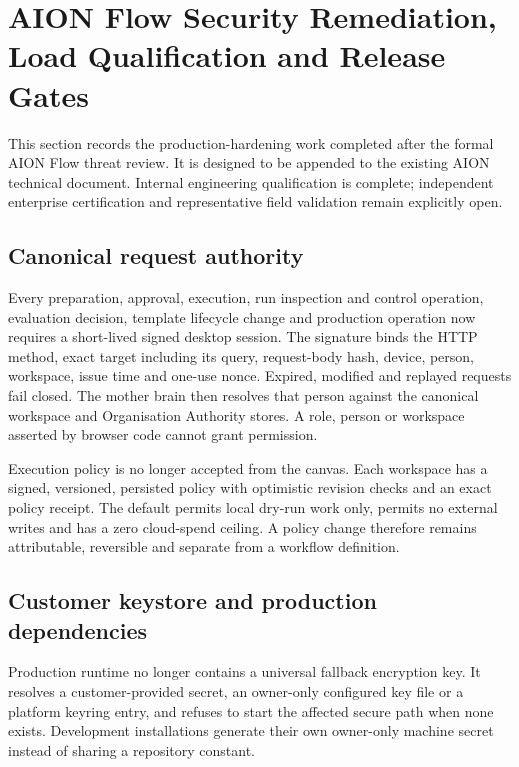 \section{AION Flow Security Remediation, Load Qualification and Release Gates}
\label{sec:aion-flow-security-load-qualification}

This section records the production-hardening work completed after the formal AION Flow threat
review. It is designed to be appended to the existing AION technical document. Internal engineering
qualification is complete; independent enterprise certification and representative field validation
remain explicitly open.

\subsection{Canonical request authority}

Every preparation, approval, execution, run inspection and control operation, evaluation decision,
template lifecycle change and production operation now requires a short-lived signed desktop
session. The signature binds the HTTP method, exact target including its query, request-body hash,
device, person, workspace, issue time and one-use nonce. Expired, modified and replayed requests fail
closed. The mother brain then resolves that person against the canonical workspace and Organisation
Authority stores. A role, person or workspace asserted by browser code cannot grant permission.

Execution policy is no longer accepted from the canvas. Each workspace has a signed, versioned,
persisted policy with optimistic revision checks and an exact policy receipt. The default permits
local dry-run work only, permits no external writes and has a zero cloud-spend ceiling. A policy
change therefore remains attributable, reversible and separate from a workflow definition.

\subsection{Customer keystore and production dependencies}

Production runtime no longer contains a universal fallback encryption key. It resolves a
customer-provided secret, an owner-only configured key file or a platform keyring entry, and refuses
to start the affected secure path when none exists. Development installations generate their own
owner-only machine secret instead of sharing a repository constant.

